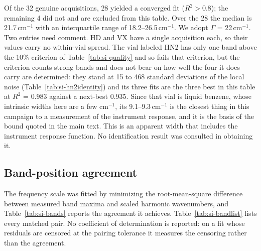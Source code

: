 \documentclass[11pt]{article}
\newcommand*\wn{\ensuremath{\text{cm}^{-1}}}
\begin{document}
\begin{table}[htbp]
\begin{flushleft}\footnotesize Of the 32 genuine acquisitions, 28 yielded a converged fit ($R^2 > 0.8$); the remaining 4 did not and are excluded from this table. Over the 28 the median is 21.7\,\wn{} with an interquartile range of 18.2--26.5\,\wn{}. We adopt $\Gamma$ = 22\,\wn{}. Two entries need comment. HD and VX have a single acquisition each, so their values carry no within-vial spread. The vial labeled HN2 has only one band above the 10\% criterion of Table~\ref{tab:si-quality} and so fails that criterion, but the criterion counts strong bands and does not bear on how well the four it does carry are determined: they stand at 15 to 468 standard deviations of the local noise (Table~\ref{tab:si-hn2identity}) and its three fits are the three best in this table at $R^2$ = 0.983 against a next-best 0.935. Since that vial is liquid benzene, whose intrinsic widths here are a few \wn{}, its 9.1--9.3\,\wn{} is the closest thing in this campaign to a measurement of the instrument response, and it is the basis of the bound quoted in the main text. This is an apparent width that includes the instrument response function. No identification result was consulted in obtaining it.\end{flushleft}
\end{table}
\clearpage

\subsection{Band-position agreement}
\label{si:bands}

The frequency scale was fitted by minimizing the root-mean-square difference between
measured band maxima and scaled harmonic wavenumbers, and Table~\ref{tab:si-bands}
reports the agreement it achieves. Table~\ref{tab:si-bandlist} lists every matched pair.
No coefficient of determination is reported: on a fit whose residuals are censored at
the pairing tolerance it measures the censoring rather than the agreement.
\end{document}
